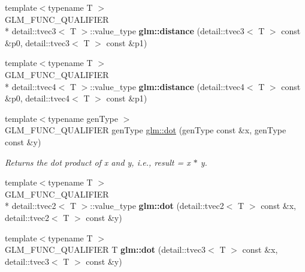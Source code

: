 \begin{DoxyCompactItemize}
\item 
\hypertarget{namespaceglm_a703b08cc8cd10426eb3885f4a9778706}{{\footnotesize template$<$typename T $>$ }\\G\-L\-M\-\_\-\-F\-U\-N\-C\-\_\-\-Q\-U\-A\-L\-I\-F\-I\-E\-R \\*
detail\-::tvec3$<$ T $>$\-::value\-\_\-type {\bfseries glm\-::distance} (detail\-::tvec3$<$ T $>$ const \&p0, detail\-::tvec3$<$ T $>$ const \&p1)}\label{namespaceglm_a703b08cc8cd10426eb3885f4a9778706}

\item 
\hypertarget{namespaceglm_aba6ad5ff80b3e5400708fea100bf8a76}{{\footnotesize template$<$typename T $>$ }\\G\-L\-M\-\_\-\-F\-U\-N\-C\-\_\-\-Q\-U\-A\-L\-I\-F\-I\-E\-R \\*
detail\-::tvec4$<$ T $>$\-::value\-\_\-type {\bfseries glm\-::distance} (detail\-::tvec4$<$ T $>$ const \&p0, detail\-::tvec4$<$ T $>$ const \&p1)}\label{namespaceglm_aba6ad5ff80b3e5400708fea100bf8a76}

\item 
{\footnotesize template$<$typename gen\-Type $>$ }\\G\-L\-M\-\_\-\-F\-U\-N\-C\-\_\-\-Q\-U\-A\-L\-I\-F\-I\-E\-R gen\-Type \hyperlink{group__core__func__geometric_ga7a31d2864eccfe665409e3b44f5e6e8d}{glm\-::dot} (gen\-Type const \&x, gen\-Type const \&y)
\begin{DoxyCompactList}\small\item\em Returns the dot product of x and y, i.\-e., result = x $\ast$ y. \end{DoxyCompactList}\item 
\hypertarget{namespaceglm_ae022826ddafad29a7a410455a905a0d6}{{\footnotesize template$<$typename T $>$ }\\G\-L\-M\-\_\-\-F\-U\-N\-C\-\_\-\-Q\-U\-A\-L\-I\-F\-I\-E\-R \\*
detail\-::tvec2$<$ T $>$\-::value\-\_\-type {\bfseries glm\-::dot} (detail\-::tvec2$<$ T $>$ const \&x, detail\-::tvec2$<$ T $>$ const \&y)}\label{namespaceglm_ae022826ddafad29a7a410455a905a0d6}

\item 
\hypertarget{namespaceglm_a39dbf81749a2043a959bc11ea7810004}{{\footnotesize template$<$typename T $>$ }\\G\-L\-M\-\_\-\-F\-U\-N\-C\-\_\-\-Q\-U\-A\-L\-I\-F\-I\-E\-R T {\bfseries glm\-::dot} (detail\-::tvec3$<$ T $>$ const \&x, detail\-::tvec3$<$ T $>$ const \&y)}\label{namespaceglm_a39dbf81749a2043a959bc11ea7810004}


\end{DoxyCompactItemize}
